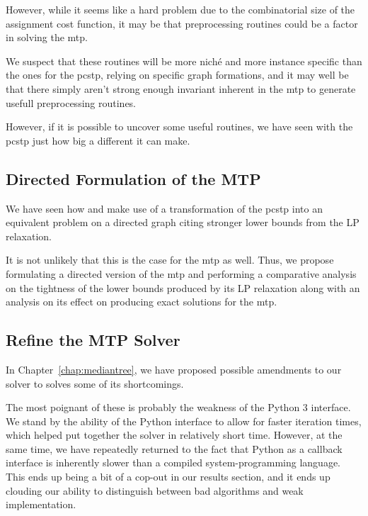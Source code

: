 However, while it seems like a hard problem due to the combinatorial size of the assignment
cost function, it may be that preprocessing routines could be a factor in solving the
\gls{mtp}.

We suspect that these routines will be more niché and more instance specific
than the ones for the \gls{pcstp}, relying
on specific graph formations, and it may well be that there simply aren't strong enough
invariant inherent in the \gls{mtp} to generate usefull preprocessing routines.

However, if it is possible to uncover some useful routines, we have seen with the \gls{pcstp}
just how big a different it can make.

\subsection{Directed Formulation of the MTP}

We have seen how \citet{ljubic2005solving} and \citet{gamrath2017scip}
make use of a transformation of
the \gls{pcstp} into an equivalent problem on a directed graph citing stronger
lower bounds from the LP relaxation.
  
It is not unlikely that this is the case for the \gls{mtp} as well. Thus, we propose
formulating a directed version of the \gls{mtp} and performing a comparative analysis
on the tightness of the lower bounds produced by its LP relaxation along with an
analysis on its effect on producing exact solutions for the \gls{mtp}.

\subsection{Refine the MTP Solver}

In Chapter~\ref{chap:mediantree}, we have proposed possible amendments to our solver to
solves some of its shortcomings.

The most poignant of these is probably the weakness of the Python 3 interface.
We stand by the ability of the Python interface to allow for faster iteration times,
which helped put together the solver in relatively short time.
However, at the same time, we have repeatedly
returned to the fact that Python as a callback interface is
inherently slower than a compiled system-programming language.
This ends up being a bit of a cop-out in our results section,
and it ends up clouding our ability
to distinguish between bad algorithms
and weak implementation.

